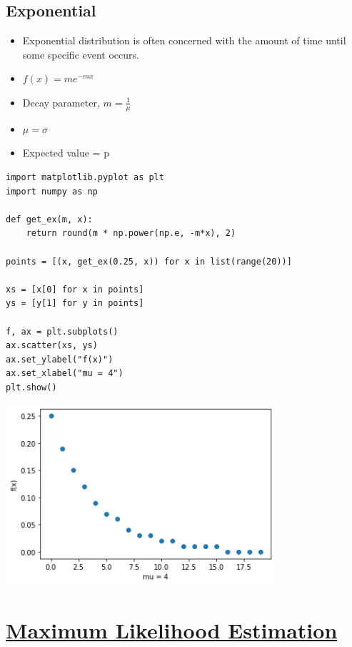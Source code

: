 \documentclass[11pt]{article}
\begin{document}
\subsection{Exponential}
\label{sec:org430a1b5}

\begin{itemize}
\item Exponential distribution is often concerned with the amount of time until some specific event occurs.
\item \(f(x) = me^{-mx}\)
\item Decay parameter, \(m = \frac{1}{\mu}\)
\item \(\mu = \sigma\)
\item Expected value = p
\end{itemize}

\begin{verbatim}
import matplotlib.pyplot as plt
import numpy as np

def get_ex(m, x):
    return round(m * np.power(np.e, -m*x), 2)

points = [(x, get_ex(0.25, x)) for x in list(range(20))]

xs = [x[0] for x in points]
ys = [y[1] for y in points]

f, ax = plt.subplots()
ax.scatter(xs, ys)
ax.set_ylabel("f(x)")
ax.set_xlabel("mu = 4")
plt.show()
\end{verbatim}

\begin{center}
\includegraphics[width=10cm]{./obipy-resources/ZODX3e.png}
\end{center}

\section{\underline{Maximum Likelihood Estimation}}
\label{sec:org4b22b3f}
\end{document}

